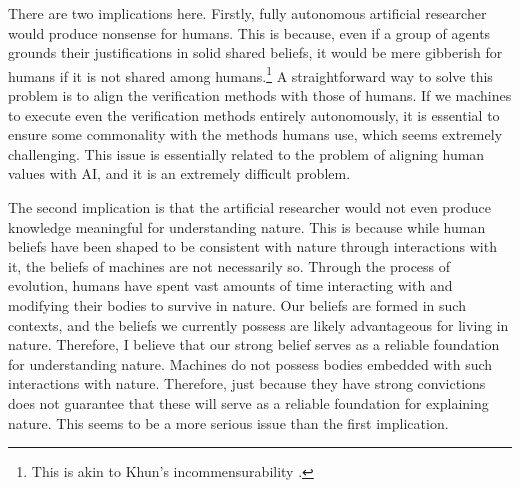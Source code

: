 There are two implications here. Firstly, fully autonomous artificial researcher would produce nonsense for humans. This is because, even if a group of agents grounds their justifications in solid shared beliefs, it would be mere gibberish for humans if it is not shared among humans.\footnote{
This is akin to Khun's incommensurability \cite{kuhn1962}. 
} A straightforward way to solve this problem is to align the verification methods with those of humans. If we machines to execute even the verification methods entirely autonomously, it is essential to ensure some commonality with the methods humans use, which seems extremely challenging. This issue is essentially related to the problem of aligning human values with AI, and it is an extremely difficult problem.



The second implication is that the artificial researcher would not even produce knowledge meaningful for understanding nature. This is because while human beliefs have been shaped to be consistent with nature through interactions with it, the beliefs of machines are not necessarily so. Through the process of evolution, humans have spent vast amounts of time interacting with and modifying their bodies to survive in nature. Our beliefs are formed in such contexts, and the beliefs we currently possess are likely advantageous for living in nature. Therefore, I believe that our strong belief serves as a reliable foundation for understanding nature. Machines do not possess bodies embedded with such interactions with nature. Therefore, just because they have strong convictions does not guarantee that these will serve as a reliable foundation for explaining nature. This seems to be a more serious issue than the first implication.


